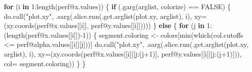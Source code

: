 \documentclass[
  letterpaper,
  DIV=11,
  numbers=noendperiod]{scrartcl}
\newenvironment{Shaded}{\begin{snugshade}}{\end{snugshade}}
\newcommand{\AttributeTok}[1]{\textcolor[rgb]{0.40,0.45,0.13}{#1}}
\newcommand{\ConstantTok}[1]{\textcolor[rgb]{0.56,0.35,0.01}{#1}}
\newcommand{\ControlFlowTok}[1]{\textcolor[rgb]{0.00,0.23,0.31}{\textbf{#1}}}
\newcommand{\DecValTok}[1]{\textcolor[rgb]{0.68,0.00,0.00}{#1}}
\newcommand{\FunctionTok}[1]{\textcolor[rgb]{0.28,0.35,0.67}{#1}}
\newcommand{\NormalTok}[1]{\textcolor[rgb]{0.00,0.23,0.31}{#1}}
\newcommand{\OtherTok}[1]{\textcolor[rgb]{0.00,0.23,0.31}{#1}}
\newcommand{\SpecialCharTok}[1]{\textcolor[rgb]{0.37,0.37,0.37}{#1}}
\newcommand{\StringTok}[1]{\textcolor[rgb]{0.13,0.47,0.30}{#1}}
\begin{document}
\begin{Shaded}
\begin{Highlighting}[]
    \ControlFlowTok{for}\NormalTok{ (i }\ControlFlowTok{in} \DecValTok{1}\SpecialCharTok{:}\FunctionTok{length}\NormalTok{(perf}\SpecialCharTok{@}\NormalTok{x.values)) \{}
        \ControlFlowTok{if}\NormalTok{ (}\FunctionTok{.garg}\NormalTok{(arglist, }\StringTok{\textquotesingle{}colorize\textquotesingle{}}\NormalTok{) }\SpecialCharTok{==} \ConstantTok{FALSE}\NormalTok{) \{}
            \FunctionTok{do.call}\NormalTok{(}\StringTok{"plot.xy"}\NormalTok{,}
                    \FunctionTok{.sarg}\NormalTok{(}\FunctionTok{.slice.run}\NormalTok{(}\FunctionTok{.get.arglist}\NormalTok{(}\StringTok{\textquotesingle{}plot.xy\textquotesingle{}}\NormalTok{, arglist), i),}
                          \AttributeTok{xy=}\NormalTok{(}\FunctionTok{xy.coords}\NormalTok{(perf}\SpecialCharTok{@}\NormalTok{x.values[[i]],}
\NormalTok{                                        perf}\SpecialCharTok{@}\NormalTok{y.values[[i]]))))}
\NormalTok{        \} }\ControlFlowTok{else}\NormalTok{ \{}
            \ControlFlowTok{for}\NormalTok{ (j }\ControlFlowTok{in} \DecValTok{1}\SpecialCharTok{:}\NormalTok{(}\FunctionTok{length}\NormalTok{(perf}\SpecialCharTok{@}\NormalTok{x.values[[i]])}\SpecialCharTok{{-}}\DecValTok{1}\NormalTok{)) \{}
\NormalTok{                segment.coloring }\OtherTok{\textless{}{-}}
\NormalTok{                  colors[}\FunctionTok{min}\NormalTok{(}\FunctionTok{which}\NormalTok{(col.cutoffs }\SpecialCharTok{\textless{}=}\NormalTok{ perf}\SpecialCharTok{@}\NormalTok{alpha.values[[i]][j]))]}
                \FunctionTok{do.call}\NormalTok{(}\StringTok{"plot.xy"}\NormalTok{,}
                        \FunctionTok{.sarg}\NormalTok{(}\FunctionTok{.slice.run}\NormalTok{(}\FunctionTok{.get.arglist}\NormalTok{(}\StringTok{\textquotesingle{}plot.xy\textquotesingle{}}\NormalTok{, arglist), i),}
                              \AttributeTok{xy=}\NormalTok{(}\FunctionTok{xy.coords}\NormalTok{(perf}\SpecialCharTok{@}\NormalTok{x.values[[i]][j}\SpecialCharTok{:}\NormalTok{(j}\SpecialCharTok{+}\DecValTok{1}\NormalTok{)],}
\NormalTok{                                            perf}\SpecialCharTok{@}\NormalTok{y.values[[i]][j}\SpecialCharTok{:}\NormalTok{(j}\SpecialCharTok{+}\DecValTok{1}\NormalTok{)])),}
                              \AttributeTok{col=}\NormalTok{ segment.coloring))}
\NormalTok{            \}}
\NormalTok{        \}}


\end{Highlighting}
\end{Shaded}
\end{document}
